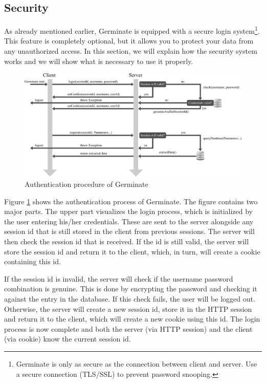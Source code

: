 \subsection{Security}
\label{sec:example_security}
As already mentioned earlier, Germinate is equipped with a secure login system\footnote{Germinate is only as secure as the connection between client and server. Use a secure connection (TLS/SSL) to prevent password snooping.}. This feature is completely optional, but it allows you to protect your data from any unauthorized access. In this section, we will explain how the security system works and we will show what is necessary to use it properly.

\begin{figure}[h]
    \centering
    \includegraphics[scale=0.5]{img/examples/authentication.pdf}
    \caption{Authentication procedure of Germinate}
    \label{fig:authentication}
\end{figure}

Figure \ref{fig:authentication} shows the authentication process of Germinate. The figure contains two major parts. The upper part visualizes the login process, which is initialized by the user entering his/her credentials. These are sent to the server alongside any session id that is still stored in the client from previous sessions. The server will then check the session id that is received. If the id is still valid, the server will store the session id and return it to the client, which, in turn, will create a cookie containing this id.

If the session id is invalid, the server will check if the username password combination is genuine. This is done by encrypting the password and checking it against the entry in the database. If this check fails, the user will be logged out. Otherwise, the server will create a new session id, store it in the HTTP session and return it to the client, which will create a new cookie using this id. The login process is now complete and both the server (via HTTP session) and the client (via cookie) know the current session id.

